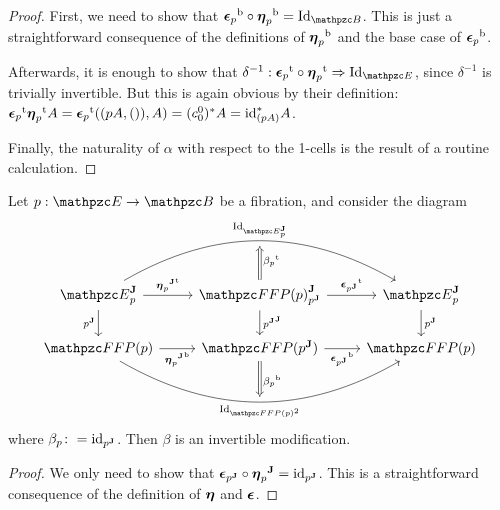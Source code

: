 \documentclass{lmcs} %
\theoremstyle{plain}\newtheorem{satz}[thm]{Satz} %
\begin{document}
\begin{proof}
	First, we need to show that $\fb{\twont{\epsilon}_p}\arcmp\fb{\twont{\eta}_p}=\Id{\ct{B}}$. This is just a straightforward consequence of the definitions of ${\boldsymbol{\eta}_p}^{\mathrm{b}}$ and the base case of ${\boldsymbol{\epsilon}_p}^{\mathrm{b}}$.
	
	Afterwards, it is enough to show that $\delta^{-1}:\ft{\twont{\epsilon}_p}\arcmp\ft{\twont{\eta}_p}\nt\Id{\ct{E}}$, since $\delta^{-1}$ is trivially invertible. But this is again obvious by their definition: ${\boldsymbol{\epsilon}_p}^{\mathrm{t}}{\boldsymbol{\eta}_p}^{\mathrm{t}}A={\boldsymbol{\epsilon}_p}^{\mathrm{t}}((pA,()),A)=(c^{0}_{0})^*A=\mathrm{id}_{(pA)}^*A$.
	
	Finally, the naturality of $\alpha$ with respect to the 1-cells is the result of a routine calculation. 
\end{proof}

\begin{prop}\label{prop:trian-id-2}
	Let $p:\ct{E}\rightarrow\ct{B}$ be a fibration, and consider the diagram
	\[\begin{tikzcd}
		{\JDomE{p}} & {\JDom{\FFFP{p}}{\JFib{p}}} & {\JDomE{p}} \\
		{\FFFP{p}} & {\FFFP{\JFib{p}}} & {\FFFP{p}}
		\arrow["{\ft{\JFun{\twont{\eta}_p}}}", from=1-1, to=1-2]
		\arrow[""{name=0, anchor=center, inner sep=0}, "{{\Id{\JDomE{p}}}}", bend left, from=1-1, to=1-3]
		\arrow["{\JFib{p}}"', from=1-1, to=2-1]
		\arrow["{\ft{\twont{\epsilon}_{\JFun{p}}}}", from=1-2, to=1-3]
		\arrow["{{\JFib{\JFib{p}}}}", from=1-2, to=2-2]
		\arrow["{{\JFib{p}}}", from=1-3, to=2-3]
		\arrow["{\fb{\JFun{\twont{\eta}_p}}}"', from=2-1, to=2-2]
		\arrow[""{name=1, anchor=center, inner sep=0}, "{{\Id{\Arr{\FFFP{p}}}}}"', bend right, from=2-1, to=2-3]
		\arrow["{\fb{\twont{\epsilon}_{\JFun{p}}}}"', from=2-2, to=2-3]
		\arrow["{\ft{\beta_p}}"', shorten >=3pt, Rightarrow, from=1-2, to=0]
		\arrow["{\fb{\beta_p}}", shorten >=3pt, Rightarrow, from=2-2, to=1]
	\end{tikzcd}\]
	where $\beta_p\colon= \mathrm{id}_{{p}^{\mathbf{J}}}$. Then $\beta$ is an invertible modification.
\end{prop}


\begin{proof}
	We only need to show that $\boldsymbol{\epsilon}_{{p}^{\mathbf{J}}}\circ {\boldsymbol{\eta}_p}^{\mathbf{J}}=\mathrm{id}_{{p}^{\mathbf{J}}}$. This is a straightforward consequence of the definition of $\boldsymbol{\eta}$ and $\boldsymbol{\epsilon}$.
	
\end{proof}
\end{document}
